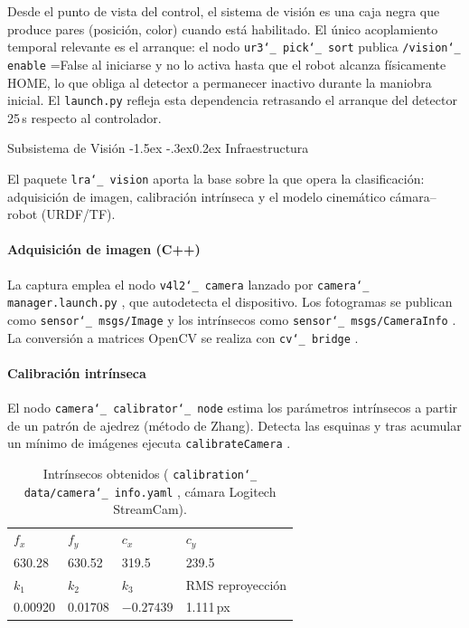 \documentclass[12pt,a4paper]{article}
\makeatletter
\newcommand{\subsecfmt}[1]{%
  {\large\bfseries\color{MediumBlue}#1}%
  \par\vspace{2pt}%
}
\renewcommand\subsection{%
  \@ifstar\subsection@star\subsection@nostar
}
\newcommand\subsection@nostar[1]{%
  \refstepcounter{subsection}%
  \addcontentsline{toc}{subsection}{\protect\numberline{\thesubsection}#1}%
  \vspace{10pt}%
  \subsecfmt{\thesubsection.\enspace #1}%
  \vspace{2pt}%
}
\newcommand\subsection@star[1]{%
  \vspace{10pt}\subsecfmt{#1}\vspace{2pt}%
}
\renewcommand\subsubsection{\@startsection{subsubsection}{3}{\z@}%
  {-1.5ex \@plus -.3ex}{0.2ex}%
  {\normalsize\bfseries\color{MediumBlue}}}
\newcommand{\code}[1]{%
  \begingroup
  \def\_{\char`_\penalty0 }%
  \def\/{\char`/\penalty0 }%
  \texttt{\small #1}%
  \endgroup}
\makeatother
\begin{document}
Desde el punto de vista del control, el sistema de visión es una caja negra que produce pares
(posición, color) cuando está habilitado. El único acoplamiento temporal relevante es el arranque: el
nodo \code{ur3\_pick\_sort} publica \code{/vision\_enable}=False al iniciarse y no lo activa hasta que el
robot alcanza físicamente HOME, lo que obliga al detector a permanecer inactivo durante la maniobra
inicial. El \code{launch.py} refleja esta dependencia retrasando el arranque del detector 25\,s respecto
al controlador.

\subsection{Subsistema de Visión}
\subsubsection{Infraestructura}
\label{sec:lra-vision}

El paquete \code{lra\_vision} aporta la base sobre la que opera la clasificación: adquisición de imagen,
calibración intrínseca y el modelo cinemático cámara--robot (URDF/TF).

\paragraph{Adquisición de imagen (C++)}
\label{sec:adquisicion}

La captura emplea el nodo \code{v4l2\_camera} lanzado por
\code{camera\_manager.launch.py}, que autodetecta el dispositivo. Los fotogramas se publican como \code{sensor\_msgs/Image}
y los intrínsecos como \code{sensor\_msgs/CameraInfo}. La conversión a matrices OpenCV se realiza con
\code{cv\_bridge}.


\paragraph{Calibración intrínseca}
\label{sec:calib-intrinseca}

El nodo \code{camera\_calibrator\_node} estima los parámetros intrínsecos a partir
de un patrón de ajedrez (método de Zhang). Detecta las esquinas y tras acumular un mínimo de imágenes
ejecuta \code{calibrateCamera}.

\begin{table}[H]
\centering
\caption{Intrínsecos obtenidos (\code{calibration\_data/camera\_info.yaml}, cámara Logitech StreamCam).}
\label{tab:intrinsecos}
\small
\begin{tabular}{@{}llll@{}}
\toprule
$f_x$ & $f_y$ & $c_x$ & $c_y$\\
630.28 & 630.52 & 319.5 & 239.5\\
\midrule
$k_1$ & $k_2$ & $k_3$ & RMS reproyección\\
0.00920 & 0.01708 & $-0.27439$ & 1.111\,px\\
\bottomrule
\end{tabular}
\end{table}
\end{document}
